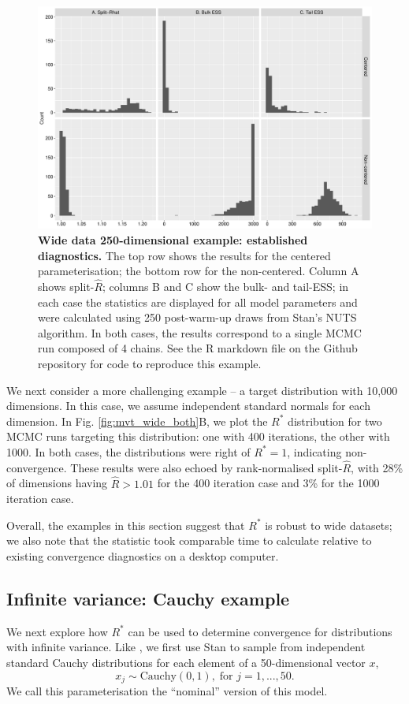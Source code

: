 \documentclass{article}
\begin{document}
\begin{figure}[!htb]
	\centerline{\includegraphics[width=1\textwidth]{../output/wide_both_diagnostics.pdf}}
	\caption{\textbf{Wide data 250-dimensional example: established diagnostics.} The top row shows the results for the centered parameterisation; the bottom row for the non-centered. Column A shows split-$\widehat{R}$; columns B and C show the bulk- and tail-ESS; in each case the statistics are displayed for all model parameters and were calculated using 250 post-warm-up draws from Stan's NUTS algorithm. In both cases, the results correspond to a single MCMC run composed of 4 chains. See the R markdown file on the Github repository for code to reproduce this example.}
	\label{fig:wide_both_diagnostics}
\end{figure}

We next consider a more challenging example -- a target distribution with 10,000 dimensions. In this case, we assume independent standard normals for each dimension. In Fig. \ref{fig:mvt_wide_both}B, we plot the $R^*$ distribution for two MCMC runs targeting this distribution: one with 400 iterations, the other with 1000. In both cases, the distributions were right of $R^*=1$, indicating non-convergence. These results were also echoed by rank-normalised split-$\widehat{R}$, with 28\% of dimensions having $\widehat{R}>1.01$ for the 400 iteration case and 3\% for the 1000 iteration case.

Overall, the examples in this section suggest that $R^*$ is robust to wide datasets; we also note that the statistic took comparable time to calculate relative to existing convergence diagnostics on a desktop computer.

\subsection{Infinite variance: Cauchy example}
We next explore how $R^*$ can be used to determine convergence for distributions with infinite variance. Like \cite{vehtari2019rank}, we first use Stan to sample from independent standard Cauchy distributions for each element of a 50-dimensional vector $x$,
%
\begin{equation}
x_j\sim \text{Cauchy}(0, 1),\; \text{for } j=1,...,50.
\end{equation}
%
We call this parameterisation the ``nominal'' version of this model.
\end{document}
